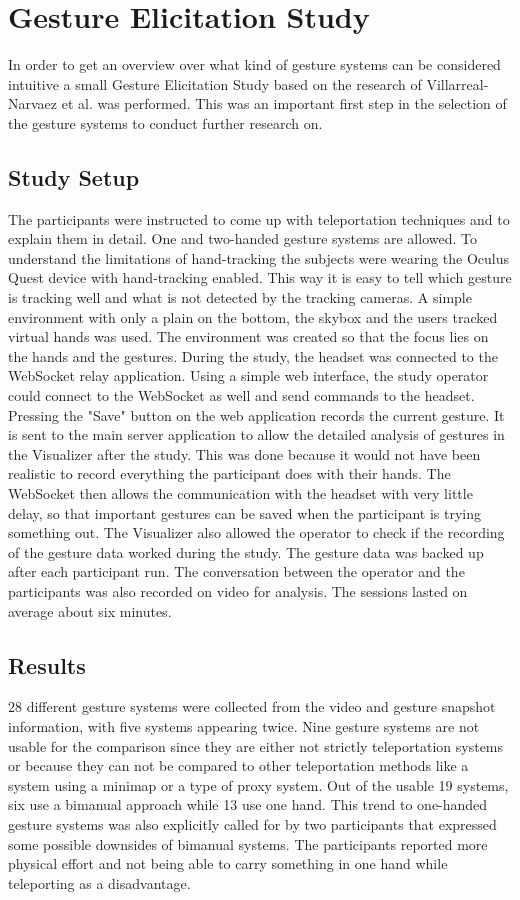 \chapter{Gesture Elicitation Study}
In order to get an overview over what kind of gesture systems can be considered intuitive a small Gesture Elicitation Study based on the research of Villarreal-Narvaez et al. \cite{elicitation} was performed. This was an important first step in the selection of the gesture systems to conduct further research on. 

\section{Study Setup}
The participants were instructed to come up with teleportation techniques and to explain them in detail. One and two-handed gesture systems are allowed. To understand the limitations of hand-tracking the subjects were wearing the Oculus Quest device with hand-tracking enabled. This way it is easy to tell which gesture is tracking well and what is not detected by the tracking cameras. A simple environment with only a plain on the bottom, the skybox and the users tracked virtual hands was used. The environment was created so that the focus lies on the hands and the gestures. During the study, the headset was connected to the WebSocket relay application. Using a simple web interface, the study operator could connect to the WebSocket as well and send commands to the headset. Pressing the "Save" button on the web application records the current gesture. It is sent to the main server application to allow the detailed analysis of gestures in the Visualizer after the study. This was done because it would not have been realistic to record everything the participant does with their hands. The WebSocket then allows the communication with the headset with very little delay, so that important gestures can be saved when the participant is trying something out. The Visualizer also allowed the operator to check if the recording of the gesture data worked during the study. The gesture data was backed up after each participant run. The conversation between the operator and the participants was also recorded on video for analysis. The sessions lasted on average about six minutes.


\section{Results}
$28$ different gesture systems were collected from the video and gesture snapshot information, with five systems appearing twice. Nine gesture systems are not usable for the comparison since they are either not strictly teleportation systems or because they can not be compared to other teleportation methods like a system using a minimap or a type of proxy system. Out of the usable 19 systems, six use a bimanual approach while 13 use one hand. This trend to one-handed gesture systems was also explicitly called for by two participants that expressed some possible downsides of bimanual systems. The participants reported more physical effort and not being able to carry something in one hand while teleporting as a disadvantage.

